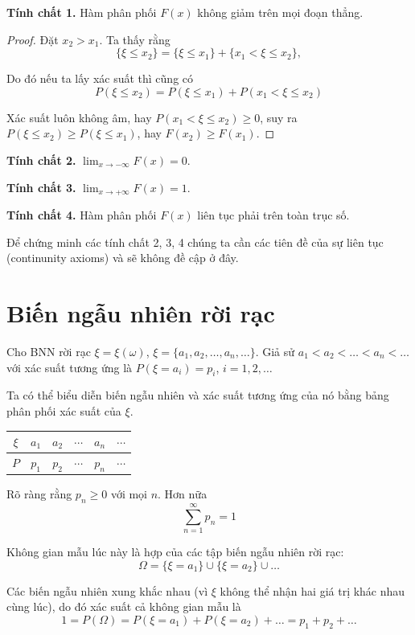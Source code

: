 \documentclass{mynotes}
\begin{document}
\textbf{Tính chất 1.} Hàm phân phối $F(x)$ không giảm trên mọi đoạn thẳng.

\begin{proof}
    Đặt $x_2 > x_1$. Ta thấy rằng \[\{ \xi \leq x_2 \} = \{ \xi \leq x_1 \} + \{ x_1 < \xi \leq x_2 \},\]
    
    Do đó nếu ta lấy xác suất thì cũng có \[ P(\xi \leq x_2) = P(\xi \leq x_1) + P(x_1 < \xi \leq x_2) \]

    Xác suất luôn không âm, hay $P(x_1 < \xi \leq x_2) \geq 0$, suy ra $P(\xi \leq x_2) \geq P(\xi \leq x_1)$, hay $F(x_2) \geq F(x_1)$.
\end{proof}

\textbf{Tính chất 2.} $\displaystyle{\lim_{x \to -\infty} F(x) = 0}$.

\textbf{Tính chất 3.} $\displaystyle{\lim_{x \to +\infty} F(x) = 1}$.

\textbf{Tính chất 4.} Hàm phân phối $F(x)$ liên tục phải trên toàn trục số.

Để chứng minh các tính chất 2, 3, 4 chúng ta cần các tiên đề của sự liên tục (continunity axioms) và sẽ không đề cập ở đây.

\section{Biến ngẫu nhiên rời rạc}

Cho BNN rời rạc $\xi = \xi(\omega)$, $\xi = \{ a_1, a_2, \ldots, a_n, \ldots \}$. Giả sử $a_1 < a_2 < \ldots < a_n < \ldots$ với xác suất tương ứng là $P(\xi = a_i) = p_i$, $i = 1, 2, \ldots$

Ta có thể biểu diễn biến ngẫu nhiên và xác suất tương ứng của nó bằng bảng phân phối xác suất của $\xi$.

\begin{table}[ht]
    \centering
    \begin{tabular}{c|c c c c c}
        $\xi$ & $a_1$ & $a_2$ & $\cdots$ & $a_n$ & $\cdots$ \\ \hline $P$ & $p_1$ & $p_2$ & $\cdots$ & $p_n$ & $\cdots$
    \end{tabular}
\end{table}

Rõ ràng rằng $p_n \geq 0$ với mọi $n$. Hơn nữa \[ \sum_{n=1}^\infty p_n = 1 \]

Không gian mẫu lúc này là hợp của các tập biến ngẫu nhiên rời rạc: \[ \Omega = \{ \xi = a_1 \} \cup \{ \xi = a_2 \} \cup \ldots \]

Các biến ngẫu nhiên xung khắc nhau (vì $\xi$ không thể nhận hai giá trị khác nhau cùng lúc), do đó xác suất cả không gian mẫu là \[ 1 = P(\Omega) = P(\xi = a_1) + P(\xi = a_2) + \ldots = p_1 + p_2 + \ldots \]
\end{document}
